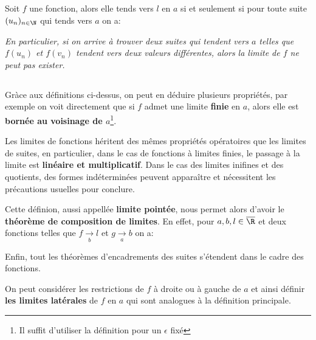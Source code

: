 \subsection*{}

Soit \(f\) une fonction, alors elle tends vers \(l\) en \(a\) si et seulement si pour toute suite \((u_n)_{n \in \N}\) qui tends vers \(a\) on a:
\begin{center}
   \textit{
      En particulier, si on arrive à trouver deux suites qui tendent vers \(a\) telles que \(f(u_n)\) et \(f(v_n)\) tendent vers deux valeurs différentes, alors la limite de \(f\) ne peut pas exister.
   }
\end{center}
\pagebreak

\subsection*{}

Gràce aux définitions ci-dessus, on peut en déduire plusieurs propriétés, par exemple on voit directement que si \(f\) admet une limite \textbf{finie} en \(a\), alors elle est \textbf{bornée au voisinage de \(a\)}\footnote[1]{Il suffit d'utiliser la définition pour un \(\epsilon\) fixé}. \<

Les limites de fonctions héritent des mêmes propriétés opératoires que les limites de suites, en particulier, dans le cas de fonctions à limites finies, le passage à la limite est \textbf{linéaire et multiplicatif}.\+
Dans le cas des limites inifines et des quotients, des formes indéterminées peuvent apparaître et nécessitent les précautions usuelles pour conclure.\<

Cette définion, aussi appellée \textbf{limite pointée}, nous permet alors d'avoir le \textbf{théorème de composition de limites}.\+
En effet, pour \(a, b, l \in \overline{\R}\) et deux fonctions telles que \(f \underset{b}{\rightarrow}l\) et \(g \underset{a}{\rightarrow}b \) on a:

Enfin, tout les théorèmes d'encadrements des suites s'étendent dans le cadre des fonctions.\<

On peut considérer les restrictions de \(f\) à droite ou à gauche de \(a\) et ainsi définir \textbf{les limites latérales} de \(f\) en \(a\) qui sont analogues à la définition principale.

